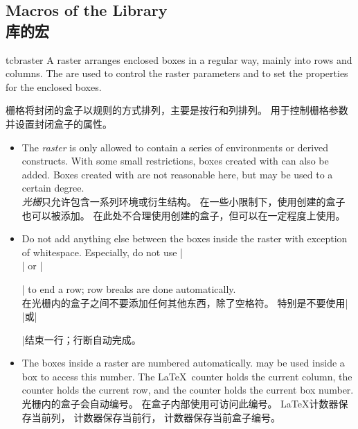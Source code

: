 \subsection{Macros of the Library\\库的宏}\label{subsec:raster_macros}

\begin{docEnvironment}[doc new and updated={2014-11-10}{2017-02-01}]{tcbraster}{}
A raster arranges enclosed boxes in a regular way, mainly into rows and
columns. The  are used to control the raster
parameters and to set the properties for the enclosed boxes.

栅格将封闭的盒子以规则的方式排列，主要是按行和列排列。  用于控制栅格参数并设置封闭盒子的属性。
\begin{itemize}
\item The \emph{raster} is only allowed to contain a series of
 environments or derived constructs.
With some small restrictions, boxes created with  can also be added.
Boxes created with  are not reasonable here, but may be
used to a certain degree.
\\\emph{光栅}只允许包含一系列环境或衍生结构。 在一些小限制下，使用创建的盒子也可以被添加。 在此处不合理使用创建的盒子，但可以在一定程度上使用。
\item Do not add anything else between the boxes inside the raster with
exception of white\-space. Especially, do not use |\\| or |\par| to end
a row; row breaks are done automatically.
\\在光栅内的盒子之间不要添加任何其他东西，除了空格符。 特别是不要使用|\\|或|\par|结束一行；行断自动完成。
\item The boxes inside a raster are numbered automatically.
 may be used inside a box to access
this number.
The \LaTeX\ counter  holds the current column,
the counter  holds the current row,
and the counter  holds the current box number.
\\光栅内的盒子会自动编号。 在盒子内部使用可访问此编号。 \LaTeX 计数器保存当前列， 计数器保存当前行， 计数器保存当前盒子编号。
\end{itemize}


\end{docEnvironment}
